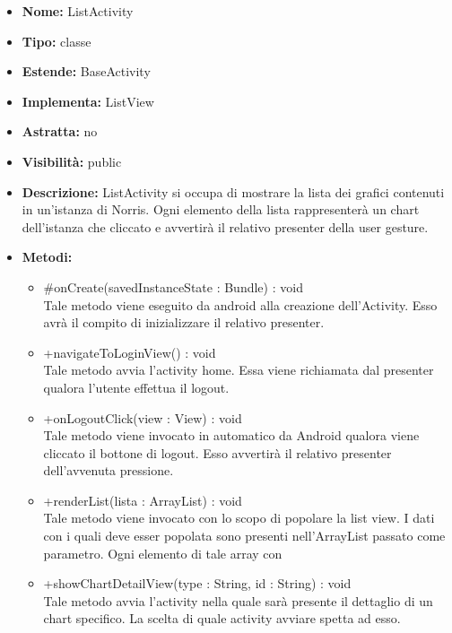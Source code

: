 			
			\begin{itemize}
			\item \textbf{Nome:} ListActivity
			\item \textbf{Tipo:} classe
			
		\item \textbf{Estende:}
		BaseActivity
		\item \textbf{Implementa:}
		ListView
		\item \textbf{Astratta:}
		no
			\item \textbf{Visibilità:} public
			\item \textbf{Descrizione:} ListActivity si occupa di mostrare la lista dei grafici contenuti in un'istanza di Norris. Ogni elemento della lista rappresenterà un chart dell'istanza che cliccato e avvertirà il relativo presenter della user gesture.
			\item \textbf{Metodi:}
				\begin{itemize}
				\setlength{\itemsep}{5pt}
				
					\item[\ding{111}] {{\#onCreate(savedInstanceState : Bundle) : void}} \\ [1mm] Tale metodo viene eseguito da android alla creazione dell'Activity. Esso avrà il compito di inizializzare il relativo presenter. 
					\item[\ding{111}] {{+navigateToLoginView() : void}} \\ [1mm] Tale metodo avvia l'activity home. Essa viene richiamata dal presenter qualora l'utente effettua il logout.
					\item[\ding{111}] {{+onLogoutClick(view : View) : void}} \\ [1mm] Tale metodo viene invocato in automatico da Android qualora viene cliccato il bottone di logout. Esso avvertirà il relativo presenter dell'avvenuta pressione.
					\item[\ding{111}] {{+renderList(lista : ArrayList) : void}} \\ [1mm] Tale metodo viene invocato con lo scopo di popolare la list view. I dati con i quali deve esser popolata sono presenti nell'ArrayList passato come parametro. Ogni elemento di tale array con
					\item[\ding{111}] {{+showChartDetailView(type : String, id : String) : void}} \\ [1mm] Tale metodo avvia l'activity nella quale sarà presente il dettaglio di un chart specifico. La scelta di quale activity avviare spetta ad esso.
				\end{itemize}
		
			\end{itemize}

